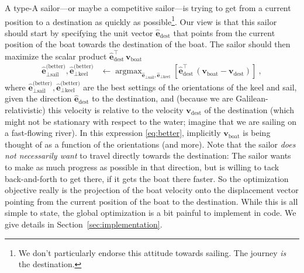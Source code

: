 \documentclass[letterpaper]{article}
\DeclareMathOperator*{\argmax}{argmax}
\renewcommand{\vec}[1]{\boldsymbol{#1}}
\newcommand{\uvec}{\vec{\hat{e}}}
\newcommand{\boat}{\text{boat}}
\newcommand{\destination}{\text{dest}}
\newcommand{\better}{\text{(better)}}
\newcommand{\sail}{\text{sail}}
\newcommand{\keel}{\text{keel}}
\newcommand{\vboat}{\vec{v}_\boat}
\newcommand{\vdest}{\vec{v}_\destination}
\newcommand{\secref}[1]{Section~\ref{#1}}
\begin{document}
A type-A sailor---or maybe a competitive sailor---is trying to get from a current position to a destination as quickly as possible\footnote{%
We don't particularly endorse this attitude towards sailing. The journey \emph{is} the destination.}.
Our view is that this sailor should start by specifying the unit vector $\uvec_\destination$ that points from the current position of the boat towards the destination of the boat.
The sailor should then maximize the scalar product $\uvec_\destination^\top\,\vboat$
\begin{align}\label{eq:better}
    \uvec_{\perp\sail}^\better,\uvec_{\perp\keel}^\better &\leftarrow \argmax_{\uvec_{\perp\sail},\uvec_{\perp\keel}} \left[\uvec_\destination^\top\,(\vboat-\vdest)\right] ~,
\end{align}
where $\uvec_{\perp\sail}^\better,\uvec_{\perp\keel}^\better$ are the best settings of the orientations of the keel and sail, given the direction $\uvec_\destination$ to the destination, and (because we are Galilean-relativistic) this velocity is relative to the velocity $\vdest$ of the destination (which might not be stationary with respect to the water; imagine that we are sailing on a fast-flowing river).
In this expression \eqref{eq:better}, implicitly $\vboat$ is being thought of as a function of the orientations (and more).
Note that the sailor \emph{does not necessarily want} to travel directly towards the destination:
The sailor wants to make as much progress as possible in that direction, but is willing to tack back-and-forth to get there, if it gets the boat there faster.
So the optimization objective really is the projection of the boat velocity onto the displacement vector pointing from the current position of the boat to the destination.
While this is all simple to state, the global optimization is a bit painful to implement in code.
We give details in \secref{sec:implementation}.
\end{document}
